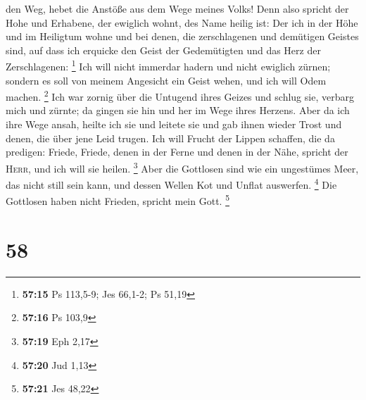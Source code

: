 den Weg, hebet die Anstöße aus dem Wege meines Volks! 
Denn also spricht der Hohe und Erhabene, der ewiglich wohnt, des Name
heilig ist: Der ich in der Höhe und im Heiligtum wohne und bei denen,
die zerschlagenen und demütigen Geistes sind, auf dass ich erquicke den
Geist der Gedemütigten und das Herz der Zerschlagenen: \footnote{\textbf{57:15}
  Ps 113,5-9; Jes 66,1-2; Ps 51,19}  Ich will nicht
immerdar hadern und nicht ewiglich zürnen; sondern es soll von meinem
Angesicht ein Geist wehen, und ich will Odem machen. \footnote{\textbf{57:16}
  Ps 103,9}  Ich war zornig über die Untugend ihres
Geizes und schlug sie, verbarg mich und zürnte; da gingen sie hin und
her im Wege ihres Herzens.  Aber da ich ihre Wege ansah,
heilte ich sie und leitete sie und gab ihnen wieder Trost und denen, die
über jene Leid trugen.  Ich will Frucht der Lippen
schaffen, die da predigen: Friede, Friede, denen in der Ferne und denen
in der Nähe, spricht der \textsc{Herr}, und ich will sie heilen.
\footnote{\textbf{57:19} Eph 2,17}  Aber die Gottlosen
sind wie ein ungestümes Meer, das nicht still sein kann, und dessen
Wellen Kot und Unflat auswerfen. \footnote{\textbf{57:20} Jud 1,13}
 Die Gottlosen haben nicht Frieden, spricht mein Gott.
\footnote{\textbf{57:21} Jes 48,22}

\hypertarget{section-22}{%
\section{58}\label{section-22}}

